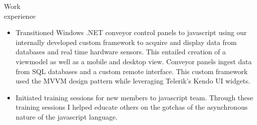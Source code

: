 \begin{category}{Work \\experience}
\begin{itemize}
\item Transitioned Windows .NET conveyor control panels to javascript using our internally developed custom framework to acquire and display data from databases and real time hardware sensors. This entailed creation of a viewmodel as well as a mobile and desktop view. Conveyor panels ingest data from SQL databases and a custom remote interface. This custom framework used the MVVM design pattern while leveraging Telerik's Kendo UI widgets.


\item Initiated training sessions for new members to javascript team. Through these training sessions I helped educate others on the gotchas of the asynchronous nature of the javascript language.%




\end{itemize}
\end{category}
